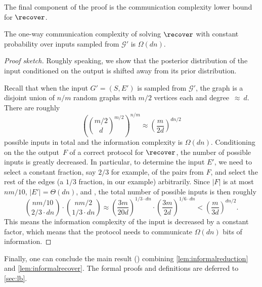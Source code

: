 \noindent
The final component of the proof is the communication complexity lower bound for $\recover$.

\begin{lemma}
	\label{lem:informalrecover}
    The one-way communication complexity of solving $\recover$ with constant probability over inputs sampled from $\mathcal{G}'$ is $\Omega(dn)$.
\end{lemma}

\begin{proof}[Proof sketch]
    Roughly speaking, we show that the posterior distribution of the input conditioned on the output is shifted away from its prior distribution.
    
    Recall that when the input $G'=(S,E')$ is sampled from $\mathcal{G}'$, the graph is a disjoint union of $n/m$ random graphs with $m/2$ vertices each and degree~$\approx~d$. There are roughly 
    $$\left(\binom{m/2}{d}^{m/2}\right)^{n/m} \approx \left(\frac{m}{2d}\right)^{dn/2}$$ 
    possible inputs in total and the information complexity is $\Omega(dn)$. Conditioning on the the output~$F$ of  a correct protocol for $\recover$, the number of possible inputs is greatly decreased. In particular, to determine the input $E'$, we need to select a constant fraction, say $2/3$ for example, of the pairs from $F$, and select the rest of the edges (a $1/3$ fraction, in our example)  arbitrarily. Since $|F|$ is at most $nm/10$, $|E'| = \Theta(dn)$, and , the total number of possible inputs is then roughly 
    $$\binom{nm/10}{2/3 \cdot dn} \cdot \binom{nm/2}{1/3 \cdot dn} \approx \left(\frac{3m}{20d}\right)^{1/3 \cdot dn} \cdot \left(\frac{3m}{2d}\right)^{1/6 \cdot dn} < \left(\frac{m}{3d}\right)^{ dn/2}.$$
    This means the information complexity of the input is decreased by a constant factor, which means that the protocol needs to communicate $\Omega(dn)$ bits of information.
\end{proof}


\noindent
Finally, one can conclude the main result () combining \cref{lem:informalreduction} and \cref{lem:informalrecover}. The formal proofs and definitions are deferred to \cref{sec:lb}.


